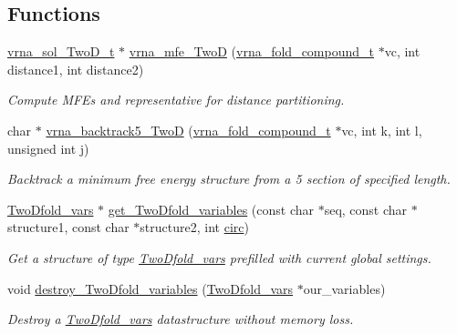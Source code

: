 \subsection*{Functions}
\begin{DoxyCompactItemize}
\item 
\hyperlink{group__kl__neighborhood__mfe_structvrna__sol__TwoD__t}{vrna\+\_\+sol\+\_\+\+Two\+D\+\_\+t} $\ast$ \hyperlink{group__kl__neighborhood__mfe_ga243c288b463147352829df04de6a2f77}{vrna\+\_\+mfe\+\_\+\+Two\+D} (\hyperlink{group__fold__compound_ga1b0cef17fd40466cef5968eaeeff6166}{vrna\+\_\+fold\+\_\+compound\+\_\+t} $\ast$vc, int distance1, int distance2)
\begin{DoxyCompactList}\small\item\em Compute M\+F\+E\textquotesingle{}s and representative for distance partitioning. \end{DoxyCompactList}\item 
char $\ast$ \hyperlink{group__kl__neighborhood__mfe_ga15a96fc96f4f4c2e01a11b3e17d1ef43}{vrna\+\_\+backtrack5\+\_\+\+Two\+D} (\hyperlink{group__fold__compound_ga1b0cef17fd40466cef5968eaeeff6166}{vrna\+\_\+fold\+\_\+compound\+\_\+t} $\ast$vc, int k, int l, unsigned int j)
\begin{DoxyCompactList}\small\item\em Backtrack a minimum free energy structure from a 5\textquotesingle{} section of specified length. \end{DoxyCompactList}\item 
\hyperlink{group__kl__neighborhood__mfe_structTwoDfold__vars}{Two\+Dfold\+\_\+vars} $\ast$ \hyperlink{group__kl__neighborhood__mfe_gac9284f132cf0eaa0a2f43590eda05488}{get\+\_\+\+Two\+Dfold\+\_\+variables} (const char $\ast$seq, const char $\ast$structure1, const char $\ast$structure2, int \hyperlink{group__model__details_gaf9202a1a09f5828dc731e2d9a10fa111}{circ})
\begin{DoxyCompactList}\small\item\em Get a structure of type \hyperlink{group__kl__neighborhood__mfe_structTwoDfold__vars}{Two\+Dfold\+\_\+vars} prefilled with current global settings. \end{DoxyCompactList}\item 
void \hyperlink{group__kl__neighborhood__mfe_ga05bf4f31d216b1b160fd2d3d68e9b487}{destroy\+\_\+\+Two\+Dfold\+\_\+variables} (\hyperlink{group__kl__neighborhood__mfe_structTwoDfold__vars}{Two\+Dfold\+\_\+vars} $\ast$our\+\_\+variables)
\begin{DoxyCompactList}\small\item\em Destroy a \hyperlink{group__kl__neighborhood__mfe_structTwoDfold__vars}{Two\+Dfold\+\_\+vars} datastructure without memory loss. \end{DoxyCompactList}\item 

\end{DoxyCompactItemize}
